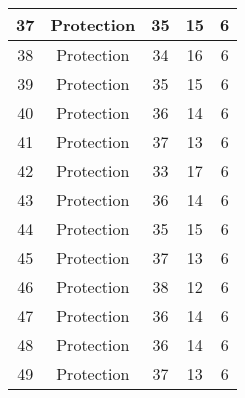 \documentclass[results.tex]{subfiles}
\begin{document}
\begin{center}
\begin{tabular}{| c || c | c | c | c |}
            \hline
            37                      & Protection                   & 35                     & 15                      & 6                    \\
            \hline
            38                      & Protection                   & 34                     & 16                      & 6                    \\
            \hline
            39                      & Protection                   & 35                     & 15                      & 6                    \\
            \hline
            40                      & Protection                   & 36                     & 14                      & 6                    \\
            \hline
            41                      & Protection                   & 37                     & 13                      & 6                    \\
            \hline
            42                      & Protection                   & 33                     & 17                      & 6                    \\
            \hline
            43                      & Protection                   & 36                     & 14                      & 6                    \\
            \hline
            44                      & Protection                   & 35                     & 15                      & 6                    \\
            \hline
            45                      & Protection                   & 37                     & 13                      & 6                    \\
            \hline
            46                      & Protection                   & 38                     & 12                      & 6                    \\
            \hline
            47                      & Protection                   & 36                     & 14                      & 6                    \\
            \hline
            48                      & Protection                   & 36                     & 14                      & 6                    \\
            \hline
            49                      & Protection                   & 37                     & 13                      & 6                    \\
            \hline
        \end{tabular}
    \end{center}
\end{document}
